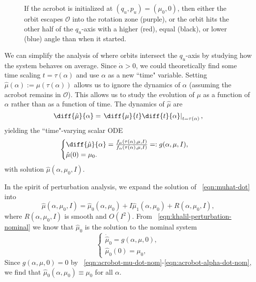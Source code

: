 \begin{figure}
    \centering 
    \caption{If the acrobot is initialized at \((q_u,p_u) = (\mu_0,0)\), then
        either the orbit escapes \(\mathcal{O}\) into the rotation
        zone (purple), or the orbit hits the other half of the \(q_u\)-axis 
        with a higher (red), equal (black), or lower (blue) angle than when it
        started.}
    \label{fig:acrobot-possible-orbits}
\end{figure}

We can simplify the analysis of where orbits intersect the \(q_u\)-axis 
by studying how the system behaves on average.
Since \(\dot{\alpha} > 0\), we could theoretically find some time scaling 
\(t = \tau(\alpha)\) and use \(\alpha\) as a new ``time" variable.
Setting \(\hat{\mu}(\alpha) := \mu(\tau(\alpha))\) allows us to ignore the
dynamics of \(\alpha\) (assuming the acrobot remains in \(\mathcal{O}\)).
This allows us to study the evolution of \(\mu\) as a 
function of \(\alpha\) rather than as a function of time.
The dynamics of \(\hat{\mu}\) are
\[
    \diff{\hat{\mu}}{\alpha} = 
    \left.\diff{\mu}{t} \diff{t}{\alpha} \right|_{t =\tau(\alpha)}
    ,
\] 
yielding the ``time"-varying scalar ODE
\begin{equation}\label{eqn:muhat-dot}
    \begin{cases}
        \diff{\hat{\mu}}{\alpha} 
        = \frac{f_\mu(\tau(\alpha),\mu,I)}{f_\alpha(\tau(\alpha),\mu,I)}
        =: g(\alpha,\mu,I)
        , \\
        \hat{\mu}(0) = \mu_0
        .
    \end{cases}
\end{equation}
with solution \(\hat{\mu}(\alpha,\mu_0,I)\).

In the spirit of perturbation analysis, we expand the solution of
~\eqref{eqn:muhat-dot} into
\begin{equation}\label{eqn:acrobot-muhat-approx}
    \hat{\mu}(\alpha,\mu_0,I) = \hat{\mu}_0(\alpha,\mu_0) + I
    \hat{\mu}_1(\alpha,\mu_0)
    + R(\alpha,\mu_0,I)
    ,
\end{equation}
where \(R(\alpha,\mu_0,I)\) is smooth and \(O(I^2)\).
From ~\eqref{eqn:khalil-perturbation-nominal} we know that 
\(\hat{\mu}_0\) is the solution to the nominal system
\[
\begin{cases}
    \dot{\hat{\mu}}_0 = g(\alpha,\mu,0)
    , \\
    \hat{\mu}_0(0) = \mu_0
    ,
\end{cases}
\]
Since \(g(\alpha,\mu,0) = 0\) by 
~\eqref{eqn:acrobot-mu-dot-nom}-\eqref{eqn:acrobot-alpha-dot-nom}, we find that
\(\hat{\mu}_0(\alpha,\mu_0) \equiv \mu_0\) for all \(\alpha\).

